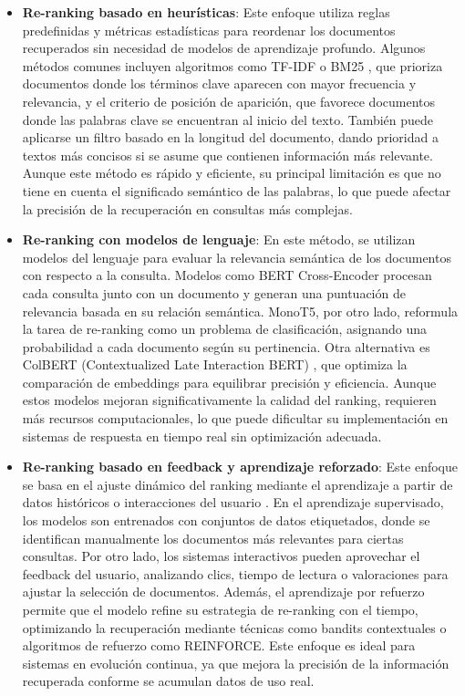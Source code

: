 \begin{itemize}
    \item \textbf{Re-ranking basado en heurísticas}: Este enfoque utiliza reglas predefinidas y métricas estadísticas para reordenar los documentos recuperados sin necesidad de modelos de aprendizaje profundo. 
    Algunos métodos comunes incluyen algoritmos como TF-IDF o BM25 \cite{llordes2023explainlikeibm25}, que prioriza documentos donde los términos clave aparecen con mayor frecuencia y relevancia, y el criterio de posición de aparición, que favorece documentos donde las palabras clave se encuentran al inicio del texto. 
    También puede aplicarse un filtro basado en la longitud del documento, dando prioridad a textos más concisos si se asume que contienen información más relevante. 
    Aunque este método es rápido y eficiente, su principal limitación es que no tiene en cuenta el significado semántico de las palabras, lo que puede afectar la precisión de la recuperación en consultas más complejas.

    \item \textbf{Re-ranking con modelos de lenguaje}: En este método, se utilizan modelos del lenguaje para evaluar la relevancia semántica de los documentos con respecto a la consulta. 
    Modelos como BERT Cross-Encoder procesan cada consulta junto con un documento y generan una puntuación de relevancia basada en su relación semántica. 
    MonoT5, por otro lado, reformula la tarea de re-ranking como un problema de clasificación, asignando una probabilidad a cada documento según su pertinencia. 
    Otra alternativa es ColBERT (Contextualized Late Interaction BERT) \cite{khattab2020colbertefficienteffectivepassage}, que optimiza la comparación de embeddings para equilibrar precisión y eficiencia. 
    Aunque estos modelos mejoran significativamente la calidad del ranking, requieren más recursos computacionales, lo que puede dificultar su implementación en sistemas de respuesta en tiempo real sin optimización adecuada.

    \item \textbf{Re-ranking basado en feedback y aprendizaje reforzado}: Este enfoque se basa en el ajuste dinámico del ranking mediante el aprendizaje a partir de datos históricos o interacciones del usuario \cite{Nguyen2024}. 
    En el aprendizaje supervisado, los modelos son entrenados con conjuntos de datos etiquetados, donde se identifican manualmente los documentos más relevantes para ciertas consultas. 
    Por otro lado, los sistemas interactivos pueden aprovechar el feedback del usuario, analizando clics, tiempo de lectura o valoraciones para ajustar la selección de documentos. 
    Además, el aprendizaje por refuerzo permite que el modelo refine su estrategia de re-ranking con el tiempo, optimizando la recuperación mediante técnicas como bandits contextuales o algoritmos de refuerzo como REINFORCE. 
    Este enfoque es ideal para sistemas en evolución continua, ya que mejora la precisión de la información recuperada conforme se acumulan datos de uso real.

\end{itemize}


